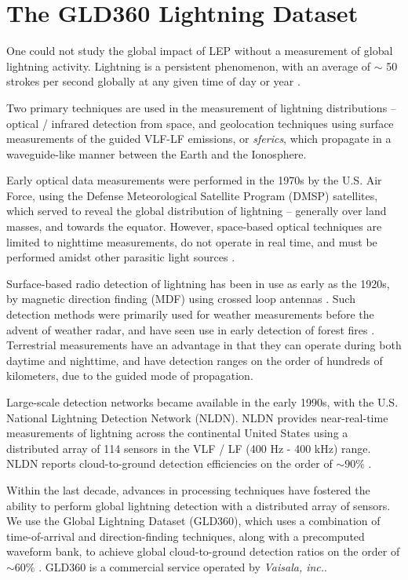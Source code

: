 \section{The GLD360 Lightning Dataset}
One could not study the global impact of LEP without a measurement of global lightning activity. Lightning is a persistent phenomenon, with an average of $\sim$ 50 strokes per second globally at any given time of day or year \citep{Brooks1925, Orville1979}.

Two primary techniques are used in the measurement of lightning distributions -- optical / infrared detection from space, and geolocation techniques using surface measurements of the guided VLF-LF emissions, or \emph{sferics}, which propagate in a waveguide-like manner between the Earth and the Ionosphere. 

Early optical data measurements were performed in the 1970s by the U.S. Air Force, using the Defense Meteorological Satellite Program (DMSP) satellites, which served to reveal the global distribution of lightning -- generally over land masses, and towards the equator. However, space-based optical techniques are limited to nighttime measurements, do not operate in real time, and must be performed amidst other parasitic light sources \citep{Orville1995}.

Surface-based radio detection of lightning has been in use as early as the 1920s, by magnetic direction finding (MDF) using crossed loop antennas \citep{Horner1954, Horner1957}. Such detection methods were primarily used for weather measurements before the advent of weather radar, and have seen use in early detection of forest fires \citep{Krider1980}. Terrestrial measurements have an advantage in that they can operate during both daytime and nighttime, and have detection ranges on the order of hundreds of kilometers, due to the guided mode of propagation.

Large-scale detection networks became available in the early 1990s, with the U.S. National Lightning Detection Network (NLDN). NLDN provides near-real-time measurements of lightning across the continental United States using a distributed array of 114 sensors in the VLF / LF (400 Hz - 400 kHz) range. NLDN reports cloud-to-ground detection efficiencies on the order of $\sim90\%$ \citep{Nag2011}. 

Within the last decade, advances in processing techniques have fostered the ability to perform global lightning detection with a distributed array of sensors. We use the Global Lightning Dataset (GLD360), which uses a combination of time-of-arrival and direction-finding techniques, along with a precomputed waveform bank, to achieve global cloud-to-ground detection ratios on the order of $\sim{60\%}$ \citep{Said2010a}. GLD360 is a commercial service operated by \emph{Vaisala, inc.}.

